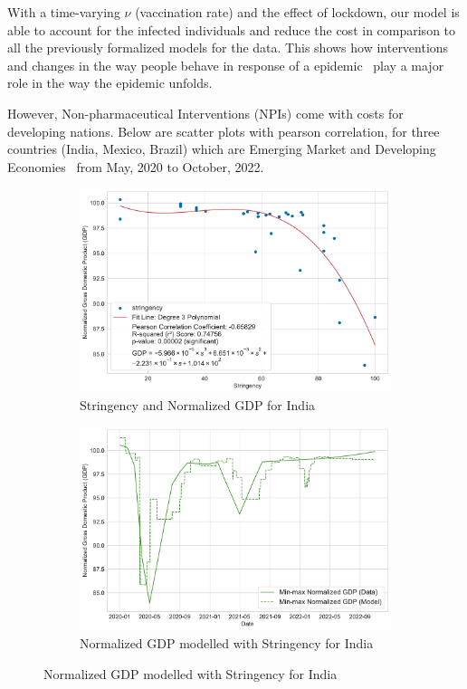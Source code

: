 \documentclass[tikz,fleqn,12pt]{wlscirep}
\begin{document}
With a time-varying $\nu$ (vaccination rate) and the effect of lockdown, our model is able to account for the infected individuals and reduce the cost in comparison to all the previously formalized models for the data. This shows how interventions and changes in the way people behave in response of a epidemic~\cite{Caldwell2021} play a major role in the way the epidemic unfolds.

However, Non-pharmaceutical Interventions (NPIs) come with costs for developing nations. Below are scatter plots with pearson correlation, for three countries (India, Mexico, Brazil) which are Emerging Market and Developing Economies~\cite{IMFCovid} from May, 2020 to October, 2022.
\begin{figure}[htbp!]
  \centering
  \begin{subfigure}[t]{0.48\textwidth}
    \centering
    \includegraphics[width=\linewidth]{images/stringency_vs_gdp_IND.pdf}
    \caption{Stringency and Normalized GDP for India}
  \end{subfigure}
  \label{fig:stringency_vs_gdp_IND}
  \hfill
  \begin{subfigure}[t]{0.48\textwidth}
    \centering
    \includegraphics[width=\linewidth]{images/gdp_modelled_with_stringency_IND.pdf}
    \caption{Normalized GDP modelled with Stringency for India}
  \end{subfigure}
  \label{fig:gdp_modelled_with_stringency_IND}


\end{figure}
\end{document}
